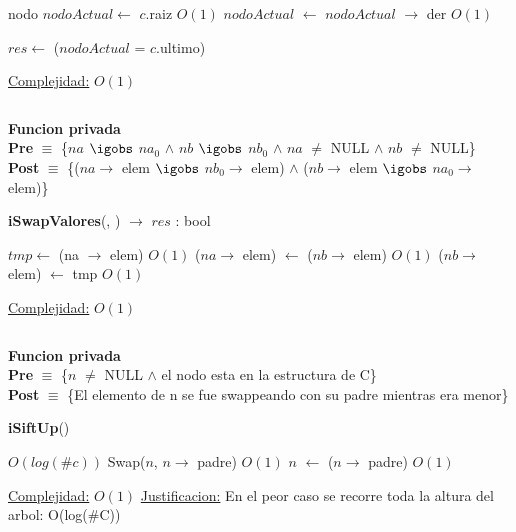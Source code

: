 \begin{Algoritmos}
\begin{algorithm}[H]
\begin{algorithmic}[1]
    \State nodo $nodoActual \gets$ $c$.raiz \Comment $O(1)$
        $nodoActual$ $\gets$ $nodoActual$ $\rightarrow$ der \Comment $O(1)$
    \EndWhile

    \State $res \gets$ ($nodoActual$ = $c$.ultimo)

    \medskip
    \Statex \underline{Complejidad:} $O(1)$
\end{algorithmic}
\end{algorithm}
    

$ $\newline

\textbf{Funcion privada}\\
\textbf{Pre} $\equiv$ \{$na$ $\igobs$ $na_0$ $\land$ $nb$ $\igobs$ $nb_0$ $\land$ $na$ $\neq$ NULL $\land$ $nb$ $\neq$ NULL\}\\%
\textbf{Post} $\equiv$ \{($na \to$ elem $\igobs$ $nb_0 \to$ elem) $\land$ ($nb \to$ elem $\igobs$ $na_0 \to$ elem)\}%
\begin{algorithm}[H]
{\textbf{iSwapValores}(, ) $\to$ $res$ : bool}
\begin{algorithmic}[1]
    
    \State $tmp \gets$ (na $\to$ elem) \Comment $O(1)$
    \State ($na \to$ elem) $\gets$ ($nb \to$ elem) \Comment $O(1)$
    \State ($nb \to$ elem) $\gets$ tmp \Comment $O(1)$

    \medskip
    \Statex \underline{Complejidad:} $O(1)$
\end{algorithmic}
\end{algorithm}

   
$ $\newline
   

\textbf{Funcion privada}\\
\textbf{Pre} $\equiv$ \{$n$ $\neq$ NULL $\land$ el nodo esta en la estructura de C\}\\%
\textbf{Post} $\equiv$ \{El elemento de n se fue swappeando con su padre mientras era menor\}%
\begin{algorithm}[H]
{\textbf{iSiftUp}()}
\begin{algorithmic}[1]

     \Comment $O(log(\#c))$
        \State Swap($n$, $n \to$ padre) \Comment $O(1)$
        \State $n$ $\gets$ ($n \to$ padre) \Comment $O(1)$
    \EndWhile

    \medskip
    \Statex \underline{Complejidad:} $O(1)$
    \Statex \underline{Justificacion:} En el peor caso se recorre toda la altura del arbol: O(log($\#$C))
\end{algorithmic}
\end{algorithm}
       
   

   
\end{Algoritmos}